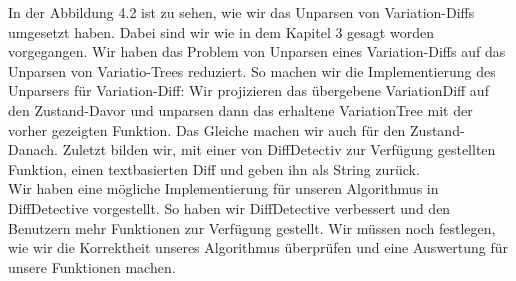 In der Abbildung 4.2 ist zu sehen, wie wir das Unparsen von Variation-Diffs umgesetzt haben. Dabei sind wir wie in dem Kapitel 3 gesagt worden vorgegangen. Wir haben das Problem von Unparsen eines Variation-Diffs auf das Unparsen von Variatio-Trees reduziert. So machen wir die Implementierung des Unparsers für Variation-Diff: Wir projizieren das übergebene VariationDiff auf den Zustand-Davor und unparsen dann das erhaltene VariationTree mit der vorher gezeigten Funktion. Das Gleiche machen wir auch für den Zustand-Danach. Zuletzt bilden wir, mit einer von DiffDetectiv zur Verfügung gestellten Funktion, einen textbasierten Diff und geben ihn als String zurück. \\

Wir haben eine mögliche Implementierung für unseren Algorithmus in DiffDetective vorgestellt. So haben wir DiffDetective verbessert und den Benutzern mehr Funktionen zur Verfügung gestellt. Wir müssen noch festlegen, wie wir die Korrektheit unseres Algorithmus überprüfen und eine Auswertung für unsere Funktionen machen.







